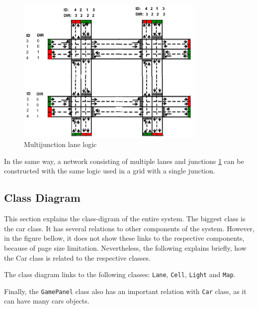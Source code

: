 \begin{figure}[H]
    \centering
    \includegraphics[width=0.8\textwidth]{pics/map3.png}
    \caption{Multijunction lane logic} 
    \label{fig:Multijunction}
\end{figure}

\indent In the same way, a network consisting of multiple lanes and junctions \ref{fig:Multijunction} can be constructed with the same logic used in a grid with a single junction.  



\subsection{Class Diagram}
This section explains the class-digram of the entire system. The biggest class is the car class. It has several relations to  other components of the system. However, in the figure bellow, it does not show these links to the respective components, because of page size limitation. Nevertheless, the following explains  briefly, how the Car class is related to the respective classes. 

The class diagram links to the following classes: \texttt{Lane}, \texttt{Cell}, \texttt{Light} and \texttt{Map}.

Finally, the \texttt{GamePanel} class also has an important relation with \texttt{Car} class, as it can have many cars objects. 


